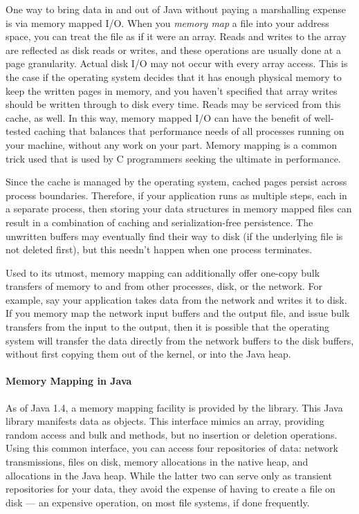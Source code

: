 One way to bring data in and out of Java without paying a marshalling expense
is via memory mapped I/O. When you \emph{memory map} a file into your address
space, you can treat the file as if it were an array. Reads and writes to the
array are reflected as disk reads or writes, and these operations are usually
done at a page granularity. Actual disk I/O may not occur with every array
access. This is the case if the operating system decides that it has enough
physical memory to keep the written pages in memory, and you haven't specified
that array writes should be written through to disk every time. Reads may be
serviced from this cache, as well. In this way, memory mapped I/O can have the
benefit of well-tested caching that balances that performance needs of all
processes running on your machine, without any work on your part.  Memory mapping
is a common trick used that is used by C programmers seeking the ultimate in
performance.

Since the cache is managed by the operating system, cached pages persist across
process boundaries. Therefore, if your application runs as multiple steps, each
in a separate process, then storing your data structures in memory mapped files
can result in a combination of caching and serialization-free persistence. The
unwritten buffers may eventually find their way to disk (if the underlying file
is not deleted first), but this needn't happen when one process terminates.

Used to its utmost, memory mapping can additionally offer one-copy bulk
transfers of memory to and from other processes, disk, or the network. For
example, say your application takes data from the network and writes it to
disk. If you memory map the network input buffers and the output file, and issue
bulk transfers from the input to the output, then it is possible that the
operating system will transfer the data directly from the network buffers to the
disk buffers, without first copying them out of the kernel, or into the
Java heap.

\paragraph{Memory Mapping in Java}
As of Java 1.4, a memory mapping facility is provided by the 
library. This Java library manifests data as  objects. This
interface mimics an array, providing random access and bulk  and
 methods, but no insertion or deletion operations. Using this common
interface, you can access four repositories of data: network transmissions, files
on disk, memory allocations in the native heap, and allocations in the Java heap.
While the latter two can serve only as transient repositories for your data, they
avoid the expense of having to create a file on disk --- an expensive operation,
on most file systems, if done frequently.

